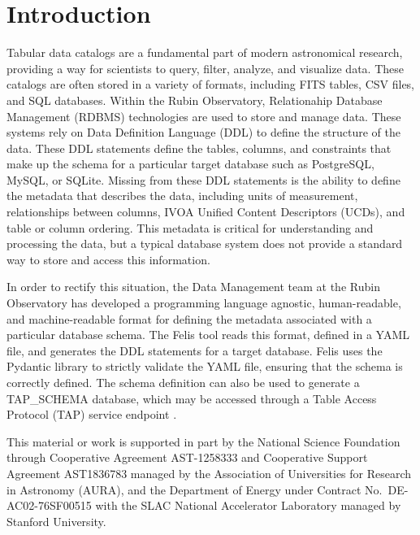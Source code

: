 \documentclass[11pt,twoside]{article}
\begin{document}

\section{Introduction}

Tabular data catalogs are a fundamental part of modern astronomical research, providing a way for scientists to query, filter, analyze, and visualize data.
These catalogs are often stored in a variety of formats, including FITS tables, CSV files, and SQL databases.
Within the Rubin Observatory, Relationahip Database Management (RDBMS) technologies are used to store and manage data.
These systems rely on Data Definition Language (DDL) to define the structure of the data.
These DDL statements define the tables, columns, and constraints that make up the schema for a particular target database such as PostgreSQL, MySQL, or SQLite.
Missing from these DDL statements is the ability to define the metadata that describes the data, including units of measurement, relationships between columns, IVOA Unified Content Descriptors (UCDs), and table or column ordering.
This metadata is critical for understanding and processing the data, but a typical database system does not provide a standard way to store and access this information.

In order to rectify this situation, the Data Management team at the Rubin Observatory has developed a programming language agnostic, human-readable, and machine-readable format for defining the metadata associated with a particular database schema.
The Felis tool reads this format, defined in a YAML file, and generates the DDL statements for a target database.
Felis uses the Pydantic library to strictly validate the YAML file, ensuring that the schema is correctly defined.
The schema definition can also be used to generate a TAP\_SCHEMA database, which may be accessed through a Table Access Protocol (TAP) service endpoint \citep{2019ivoa.spec.0927D}.

\acknowledgments This material or work is supported in part by the National Science Foundation through Cooperative Agreement AST-1258333 and Cooperative Support Agreement AST1836783 managed by the Association of Universities for Research in Astronomy (AURA), and the Department of Energy under Contract No.\ DE-AC02-76SF00515 with the SLAC National Accelerator Laboratory managed by Stanford University.


\end{document}
